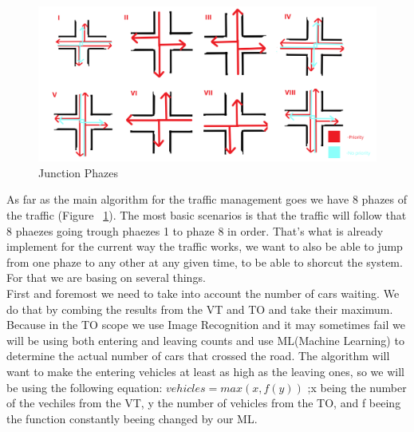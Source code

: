 \documentclass[17pt]{article}
\begin{document}
\begin{figure}[h!]
    \includegraphics[width=\textwidth]{Sketches/AvailableJunctionPhazes.png}
    \caption{Junction Phazes}
    \label{fig:Junction_Phazes}
\end{figure}

As far as the main algorithm for the traffic management goes we have 8 phazes of
the traffic (Figure ~\ref{fig:Junction_Phazes}). The most basic scenarios is that the 
traffic will follow that 8 phaezes going trough phaezes 1 to phaze 8 in order. That's
what is already implement for the current way the traffic works, we want to also be
able to jump from one phaze to any other at any given time, to be able to shorcut
the system. For that we are basing on several things.\\

\indent \indent
First and foremost we need to take into 
account the number of cars waiting. We do that by combing the results from the 
VT and TO and take their maximum. Because in the TO scope we use Image Recognition 
and it may sometimes fail we will be using both entering and leaving counts and use 
ML(Machine Learning) to determine the actual number of cars that crossed the road.
The algorithm will want to make the entering vehicles at least as high as the leaving ones,
so we will be using the following equation:
\begin{math}
    vehicles = max(x, f(y)) 
\end{math}
;x being the number of the vechiles from the VT, y the number of vehicles from the TO,
and f beeing the function constantly beeing changed by our ML.\\

\pagebreak
\end{document}
